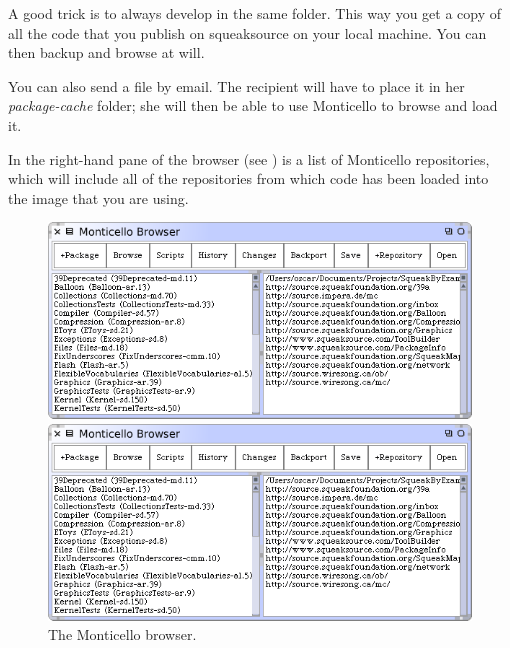 \documentclass[a4paper,10pt,twoside]{book}
\begin{document}
A good trick is to always develop in the same folder. This way you get a copy of all the code that you publish on squeaksource on your local machine. You can then backup and browse at will.

You can also send a  file by email. 
The recipient will have to place it in her \emph{package-cache} folder; she will then be able to use Monticello to browse and load it. 

In the right-hand pane of the browser (see ) is a list of Monticello repositories, which will include all of the repositories from which code has been loaded into the image that you are using.  

\begin{figure}[hbt]
\ifluluelse
	{\centerline {\includegraphics[width=\textwidth]{MonticelloBrowser}}}
	{\centerline {\includegraphics[scale=0.7]{MonticelloBrowser}}}
\caption{The Monticello browser.
\label{fig:monticello1}}
\end{figure}
\end{document}
